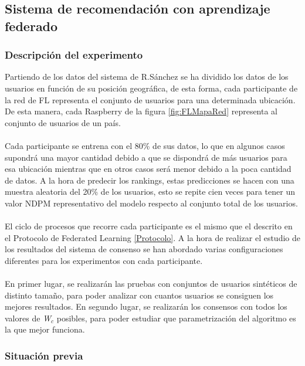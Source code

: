 \subsection{Sistema de recomendación con aprendizaje federado}

\subsubsection{Descripción del experimento}
Partiendo de los datos del sistema de R.Sánchez se ha dividido los datos de los usuarios en función de su posición geográfica, de esta forma, cada participante de la red de FL representa el conjunto de usuarios para una determinada ubicación. De esta manera, cada Raspberry de la figura \ref{fig:FLMapaRed} representa al conjunto de usuarios de un país.
\\\\
Cada participante se entrena con el 80\% de sus datos, lo que en algunos casos supondrá una mayor cantidad debido a que se dispondrá de más usuarios para esa ubicación mientras que en otros casos será menor debido a la poca cantidad de datos. A la hora de predecir los rankings, estas predicciones se hacen con una muestra aleatoria del 20\% de los usuarios, esto se repite cien veces para tener un valor NDPM representativo del modelo respecto al conjunto total de los usuarios.
\\ \\
El ciclo de procesos que recorre cada participante es el mismo que el descrito en el Protocolo de Federated Learning \ref{Protocolo}. A la hora de realizar el estudio de los resultados del sistema de consenso se han abordado varias configuraciones diferentes para los experimentos con cada participante.
\\\\
En primer lugar, se realizarán las pruebas con conjuntos de usuarios sintéticos de distinto tamaño, para poder analizar con cuantos usuarios se consiguen los mejores resultados. En segundo lugar, se realizarán los consensos con todos los valores de \textit{W$_c$} posibles, para poder estudiar que parametrización del algoritmo es la que mejor funciona.

\subsubsection{Situación previa}

